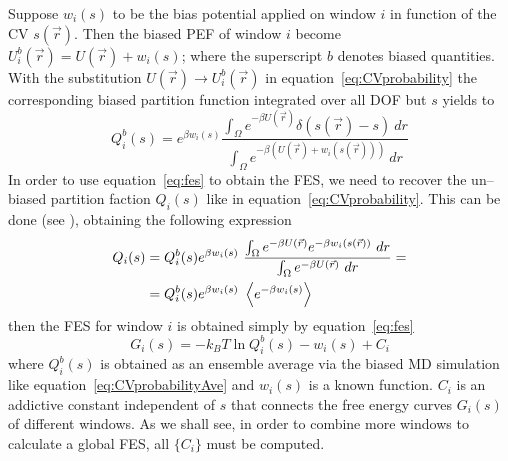 Suppose $w_i(s)$ to be the bias potential applied on window $i$ in function of the \ac{CV} $s(\vec r)$. Then the 
biased \ac{PEF} of window $i$ become $U_i^b(\vec r) = U(\vec r) + w_i(s)$; where the superscript $b$ denotes 
biased quantities. With the substitution $U(\vec r) \rightarrow U_i^b(\vec r)$ in 
equation~\eqref{eq:CVprobability} the corresponding biased partition function integrated over all \ac{DOF} but 
$s$ yields to
\begin{equation*}
	Q_i^b(s) = e^{\beta w_i(s)}\frac{ \int_\Omega e^{-\beta U(\vec r)}\delta(s(\vec r) - s)\ dr }{\int_\Omega e^{-\beta (U(\vec r) + w_i(s(\vec r)))}\ dr}
\end{equation*}
In order to use equation~\eqref{eq:fes} to obtain the \ac{FES}, we need to recover the un--biased partition 
faction $Q_i(s)$ like in equation~\eqref{eq:CVprobability}. This can be done (see \cite{Umbrella}), obtaining the 
following expression
\begin{equation}
	\begin{aligned}
	Q_i(s) &= Q_i^b(s) e^{\beta w_i(s)}\ \frac{ \int_\Omega e^{-\beta U(\vec r)}e^{-\beta w_i(s(\vec r))}\ dr }{\int_\Omega e^{-\beta U(\vec r)}\ dr} = \\
		   &= Q_i^b(s) e^{\beta w_i(s)}\ \left \langle e^{-\beta w_i(s)} \right \rangle
	\end{aligned}
	\label{eq:windowPartFunc}
\end{equation}
then the \ac{FES} for window $i$ is obtained simply by equation~\eqref{eq:fes}
\begin{equation*}
	G_i(s) = -k_BT \ln Q_i^b(s) - w_i(s) + C_i
\end{equation*}
where $Q_i^b(s)$ is obtained as an ensemble average via the biased \ac{MD} simulation like 
equation~\eqref{eq:CVprobabilityAve} and $w_i(s)$ is a known function. $C_i$ is an addictive constant independent 
of $s$ that connects the free energy curves $G_i(s)$ of different windows. As we shall see, in order to combine 
more windows to calculate a global \ac{FES}, all $\{C_i\}$ must be computed.

